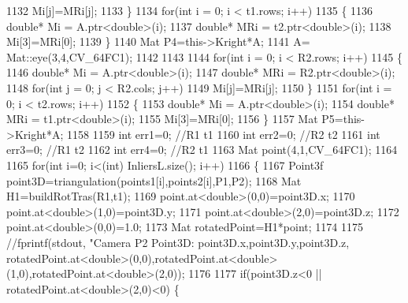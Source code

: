 \begin{DoxyCode}
1132                      Mi[j]=MRi[j];
1133          \}
1134         \textcolor{keywordflow}{for}(\textcolor{keywordtype}{int} i = 0; i < t1.rows; i++)
1135          \{
1136              \textcolor{keywordtype}{double}* Mi = A.ptr<\textcolor{keywordtype}{double}>(i);
1137              \textcolor{keywordtype}{double}* MRi = t2.ptr<\textcolor{keywordtype}{double}>(i);
1138              Mi[3]=MRi[0];
1139          \}
1140         Mat P4=this->Kright*A;
1141         A= Mat::eye(3,4,CV\_64FC1);
1142 
1143 
1144             \textcolor{keywordflow}{for}(\textcolor{keywordtype}{int} i = 0; i < R2.rows; i++)
1145      \{
1146          \textcolor{keywordtype}{double}* Mi = A.ptr<\textcolor{keywordtype}{double}>(i);
1147          \textcolor{keywordtype}{double}* MRi = R2.ptr<\textcolor{keywordtype}{double}>(i);
1148             \textcolor{keywordflow}{for}(\textcolor{keywordtype}{int} j = 0; j < R2.cols; j++)
1149                  Mi[j]=MRi[j];
1150      \}
1151     \textcolor{keywordflow}{for}(\textcolor{keywordtype}{int} i = 0; i < t2.rows; i++)
1152      \{
1153          \textcolor{keywordtype}{double}* Mi = A.ptr<\textcolor{keywordtype}{double}>(i);
1154          \textcolor{keywordtype}{double}* MRi = t1.ptr<\textcolor{keywordtype}{double}>(i);
1155          Mi[3]=MRi[0];
1156      \}
1157      Mat P5=this->Kright*A;
1158 
1159      \textcolor{keywordtype}{int} err1=0; \textcolor{comment}{//R1 t1}
1160      \textcolor{keywordtype}{int} err2=0; \textcolor{comment}{//R2 t2}
1161      \textcolor{keywordtype}{int} err3=0; \textcolor{comment}{//R1 t2}
1162      \textcolor{keywordtype}{int} err4=0; \textcolor{comment}{//R2 t1}
1163      Mat point(4,1,CV\_64FC1);
1164 
1165          \textcolor{keywordflow}{for}(\textcolor{keywordtype}{int} i=0; i<(int) InliersL.size(); i++) 
1166          \{
1167              Point3f point3D=triangulation(points1[i],points2[i],P1,P2);
1168              Mat H1=buildRotTras(R1,t1);
1169              point.at<\textcolor{keywordtype}{double}>(0,0)=point3D.x;
1170              point.at<\textcolor{keywordtype}{double}>(1,0)=point3D.y;
1171              point.at<\textcolor{keywordtype}{double}>(2,0)=point3D.z;
1172              point.at<\textcolor{keywordtype}{double}>(0,0)=1.0;
1173              Mat rotatedPoint=H1*point;
1174 
1175              \textcolor{comment}{//fprintf(stdout, "Camera P2 Point3D: %
       point3D.x,point3D.y,point3D.z, rotatedPoint.at<double>(0,0),rotatedPoint.at<double>(1,0),rotatedPoint.at<double>(2,0));}
1176 
1177              \textcolor{keywordflow}{if}(point3D.z<0 || rotatedPoint.at<\textcolor{keywordtype}{double}>(2,0)<0) \{

\end{DoxyCode}
